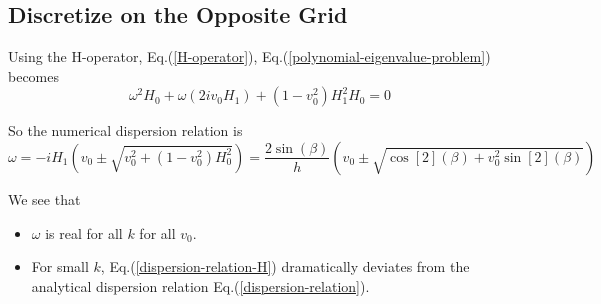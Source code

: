 \documentclass{article}
\begin{document}
\subsection{Discretize on the Opposite Grid}
Using the H-operator, Eq.(\ref{H-operator}), Eq.(\ref{polynomial-eigenvalue-problem}) becomes
\[ \omega^2H_0 + \omega(2iv_0H_1) + (1-v_0^2)H_1^2H_0 = 0 \]

So the numerical dispersion relation is
\begin{equation}\label{dispersion-relation-H}
    \omega = -iH_1 \left(v_0 \pm \sqrt{v_0^2 + (1-v_0^2)H_0^2}\right) = \frac{2\sin(\beta)}{h}\left(v_0 \pm \sqrt{\cos[2](\beta) + v_0^2\sin[2](\beta)}\right)
\end{equation}

We see that 
\begin{itemize}
    \item $\omega$ is real for all $k$ for all $v_0$.
    \item For small $k$, Eq.(\ref{dispersion-relation-H}) dramatically deviates from the analytical dispersion relation Eq.(\ref{dispersion-relation}). 
\end{itemize}
\end{document}

